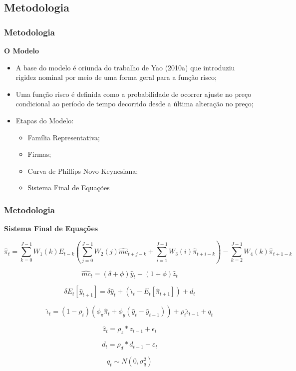 \documentclass[aspectratio=169]{beamer}
\begin{document}
\subsection{Metodologia}

\begin{frame}\frametitle{Metodologia}
  \textbf{O Modelo}
  \begin{itemize}
  \item A base do modelo é oriunda do trabalho de Yao (2010a) que introduziu rigidez nominal por meio de uma forma geral para a função risco;
  \item Uma função risco é definida como a probabilidade de ocorrer ajuste no preço condicional ao período de tempo decorrido desde a última alteração no preço;
  \item Etapas do Modelo:
    \begin{itemize}
    \item Família Representativa;
    \item Firmas;
    \item Curva de Phillips Novo-Keynesiana;
    \item Sistema Final de Equações
    \end{itemize}
  \end{itemize}
\end{frame}

\begin{frame}[shrink=20]\frametitle{Metodologia}
  \textbf{Sistema Final de Equações}

\begin{equation}
{\hat{\pi}}_{t}=\sum_{k=0}^{J-1}{{W}_{1}(k)}{E}_{t-k}(\sum_{j=0}^{J-1}{{W}_{2}(j){\hat{mc}}_{t+j-k}+\sum_{i=1}^{J-1}{{W}_{3}(i){\hat{\pi}}_{t+i-k}}})-\sum_{k=2}^{J-1}{{W}_{4}(k){\hat{\pi}}_{t+1-k}} 
\end{equation}

\begin{equation}
{\hat{mc}}_{t}=(\delta +\phi){\hat{y}}_{t}-(1+\phi){\hat{z}}_{t}
\end{equation}

\begin{equation}
\delta{E}_{t}[{\hat{y}}_{t+1}]=\delta{\hat{y}}_{t}+({\hat{\iota}}_{t}-{E}_{t}[{\hat{\pi}}_{t+1}])+{d}_{t}
\end{equation}

\begin{equation}
{\hat{\iota}}_{t}=(1-{\rho}_{i})({\phi}_{\pi}{\hat{\pi}}_{t}+{\phi}_{y}({\hat{y}}_{t}-{\hat{y}}_{t-1}))+{\rho}_{i}{\hat{\iota}}_{t-1}+{q}_{t}
\end{equation}

\begin{equation}
{\hat{z}}_{t}={\rho}_{z}\ast {z}_{t-1}+{\epsilon}_{t}
\end{equation}

\begin{equation}
{d}_{t}={\rho}_{d}\ast {d}_{t-1}+{\varepsilon}_{t}
\end{equation}

\begin{equation}
{q}_{t}\sim N\left(0,{\sigma}_{q}^{2}\right) 
\end{equation}  
\end{frame}
\end{document}
